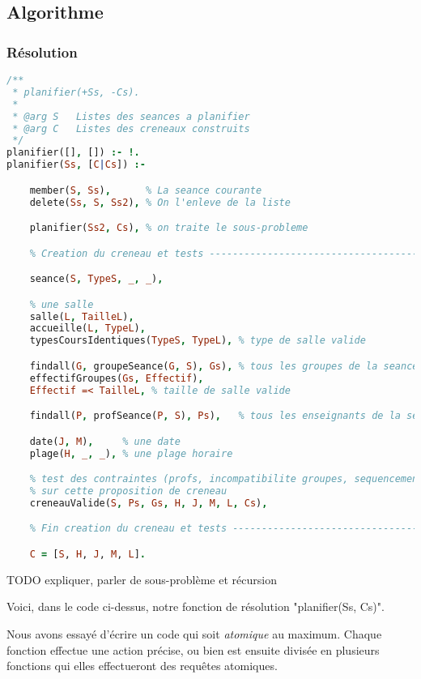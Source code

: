 
\subsection{Algorithme}

\subsubsection{Résolution}

\begin{lstlisting}[language=Prolog, caption=Resolution, captionpos=b]
/**
 * planifier(+Ss, -Cs).
 *
 * @arg S   Listes des seances a planifier
 * @arg C   Listes des creneaux construits
 */
planifier([], []) :- !.
planifier(Ss, [C|Cs]) :-

    member(S, Ss),      % La seance courante
    delete(Ss, S, Ss2), % On l'enleve de la liste

    planifier(Ss2, Cs), % on traite le sous-probleme

    % Creation du creneau et tests ---------------------------------------------

    seance(S, TypeS, _, _),

    % une salle
    salle(L, TailleL),
    accueille(L, TypeL),
    typesCoursIdentiques(TypeS, TypeL), % type de salle valide

    findall(G, groupeSeance(G, S), Gs), % tous les groupes de la seance
    effectifGroupes(Gs, Effectif),
    Effectif =< TailleL, % taille de salle valide

    findall(P, profSeance(P, S), Ps),   % tous les enseignants de la seance

    date(J, M),     % une date
    plage(H, _, _), % une plage horaire

    % test des contraintes (profs, incompatibilite groupes, sequencement)
    % sur cette proposition de creneau
    creneauValide(S, Ps, Gs, H, J, M, L, Cs),

    % Fin creation du creneau et tests -----------------------------------------

    C = [S, H, J, M, L].
\end{lstlisting}

TODO expliquer, parler de sous-problème et récursion

Voici, dans le code ci-dessus, notre fonction de résolution "planifier(Ss, Cs)". 

Nous avons essayé d'écrire un code qui soit \emph{atomique} au maximum. Chaque fonction effectue une action précise, ou bien est ensuite divisée en plusieurs fonctions qui elles effectueront des requêtes atomiques.

